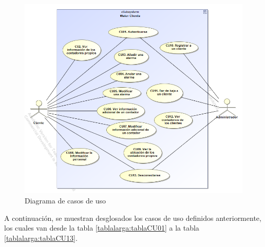 \documentclass[pdftex,11pt,a4paper]{book}
\begin{document}
\newpage

 \begin{figure}[H]
 \centering
 \includegraphics [scale=0.75] {images/diagramas/diagramaCU.png}
 \caption{Diagrama de casos de uso} \label{fig:diagrama-cu}
 \end{figure}

\vspace{1,5cm}

A continuación, se muestran desglosados los casos de uso definidos anteriormente, los cuales van desde la tabla \ref{tablalarga:tablaCU01} a la tabla \ref{tablalarga:tablaCU13}.



\renewcommand{\tablename}{Tabla}
\renewcommand{\arraystretch}{1,7}
\end{document}
